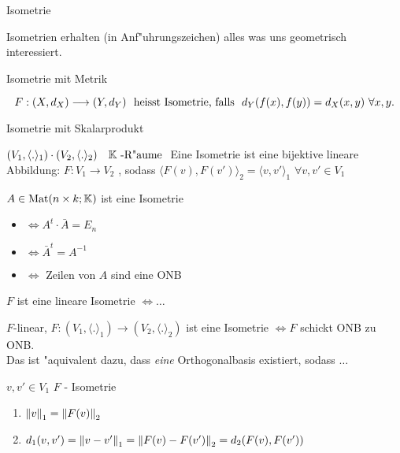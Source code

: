 \documentclass[class=article, crop=false]{standalone}
\begin{document}
\begin{zettel}{Isometrie}

Isometrien erhalten (in Anf"uhrungszeichen) alles was uns geometrisch interessiert.
\begin{flashcard}[b24hwdmo]{Isometrie mit Metrik}
	\begin{definition}
		\[
			F: (X,d_X) \longrightarrow (Y, d_Y)   \tx{ heisst Isometrie, falls } d_Y(f(x), f(y)) = d_X (x,y) \forall x,y
		.\]
	\end{definition}
\end{flashcard}

\begin{flashcard}[36kfx9i1]{Isometrie mit Skalarprodukt}
	\begin{definition}
		$(V_1, \langle .\rangle_1 ) \cdot  (V_2, \langle .\rangle_2) \quad \mathbb{K}\text{ -R"aume }$
		Eine Isometrie ist eine bijektive lineare Abbildung: $F: V_1 \to V_2$ , sodass $ \langle F(v),F(v')\rangle_2 = \langle v,v'\rangle_1$ $\forall v,v' \in  V_1$
	\end{definition}
\end{flashcard}

$A \in  \operatorname{Mat}(n \times  k; \mathbb{K})$ ist eine Isometrie
\begin{itemize}
	\item $\iff A^t \cdot  \bar{A} = E_n$
	\item $\iff \bar{A}^t = A^{-1}$
	\item $\iff $ Zeilen von $A$ sind eine ONB
\end{itemize}

\begin{flashcard}[hx19wsee]{$F$ ist eine lineare Isometrie $\iff \dots$ }

	\begin{lemma}
		$F$-linear, $F: (V_1, \langle .\rangle_1) \to (V_2, \langle .\rangle_2)$ ist eine Isometrie $\iff F$ schickt ONB zu ONB.\\
		Das ist "aquivalent dazu, dass \emph{eine} Orthogonalbasis existiert, sodass $\dots$
	\end{lemma}
\end{flashcard}

\begin{remark}
	$v,v' \in  V_1$ $F$ - Isometrie
	\begin{enumerate}
		\item $ \left\|v\right\|_1 = \left\|F(v)\right\|_2$
		\item $d_1 (v,v') = \left\|v-v'\right\|_1 = \left\|F(v)-F(v')\right\|_2 = d_2 (F(v),F(v'))$
	\end{enumerate}
\end{remark}


\end{zettel}
\end{document}
